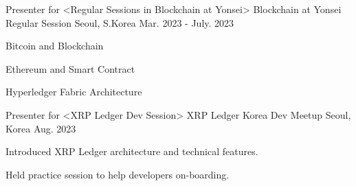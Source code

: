 


\begin{cventries}


\cventry
{Presenter for <Regular Sessions in Blockchain at Yonsei>} %
{Blockchain at Yonsei Regular Session} %
{Seoul, S.Korea} %
{Mar. 2023 - July. 2023} %
{ %
\begin{cvitems}
\item {Bitcoin and Blockchain}
\item {Ethereum and Smart Contract}
\item {Hyperledger Fabric Architecture}
\end{cvitems}
}


\cventry
{Presenter for <XRP Ledger Dev Session>} %
{XRP Ledger Korea Dev Meetup} %
{Seoul, Korea} %
{Aug. 2023} %
{ %
\begin{cvitems}
\item {Introduced XRP Ledger architecture and technical features.}
\item {Held practice session to help developers on-boarding.}
\end{cvitems}
}


\end{cventries}